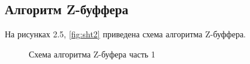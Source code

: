 \documentclass[a4paper,14pt]{report}
\begin{document}
\subsection{Алгоритм Z-буффера}
На рисунках 2.5, \ref{fig:sht2} приведена схема алгоритма Z-буффера.
 \begin{figure}[H]
 \caption{Схема алгоритма Z-буфера часть 1}
 \label{fig:sh2}
\end{figure}
\end{document}
